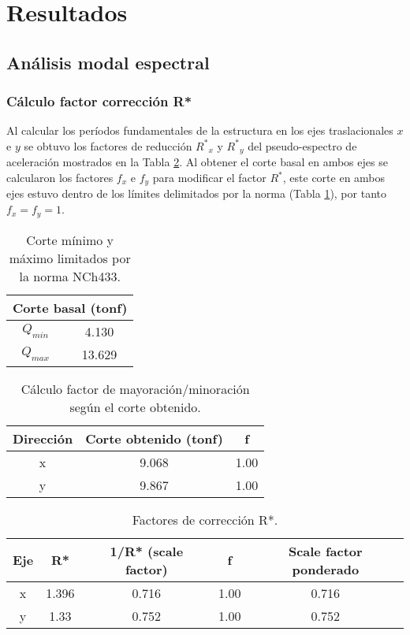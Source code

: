 \newpage
\section{Resultados}

\subsection{Análisis modal espectral}

\subsubsection{Cálculo factor corrección R*}

Al calcular los períodos fundamentales de la estructura en los ejes traslacionales $x$ e $y$ se obtuvo los factores de reducción ${R^*}_x$ y ${R^*}_y$ del pseudo-espectro de aceleración mostrados en la Tabla \ref{tab:factores-reduccion-r}. Al obtener el corte basal en ambos ejes se calcularon los factores $f_x$ e $f_y$ para modificar el factor $R^*$, este corte en ambos ejes estuvo dentro de los límites delimitados por la norma (Tabla \ref{tab:cortemaximominimo}), por tanto $f_x=f_y=1$.

\begin{table}[H]
  \centering
  \caption{Corte mínimo y máximo limitados por la norma NCh433.}
  \begin{tabular}{cc}
    \hline
    \multicolumn{2}{c}{\textbf{Corte basal (tonf)}} \bigstrut\\
    \hline
    $Q_{min}$ & 4.130 \bigstrut[t]\\
    $Q_{max}$ & 13.629 \bigstrut[b]\\
    \hline
  \end{tabular}
  \label{tab:cortemaximominimo}
\end{table}

\begin{table}[H]
  \centering
  \caption{Cálculo factor de mayoración/minoración según el corte obtenido.}
  \begin{tabular}{ccc}
    \hline
    \textbf{Dirección} & \textbf{Corte obtenido (tonf)} & \textbf{f} \bigstrut\\
    \hline
    x     & 9.068 & 1.00 \bigstrut[t]\\
    y     & 9.867 & 1.00 \bigstrut[b]\\
    \hline
  \end{tabular}
\end{table}

\begin{table}[H]
  \centering
  \caption{Factores de corrección R*.}
  \begin{tabular}{ccccc}
    \hline
    \textbf{Eje} & \textbf{R*} & \textbf{1/R* (scale factor)} & \textbf{f} & \textbf{Scale factor ponderado} \bigstrut\\
    \hline
    x     & 1.396 & 0.716 & 1.00  & 0.716 \bigstrut[t]\\
    y     & 1.33  & 0.752 & 1.00  & 0.752 \bigstrut[b]\\
    \hline
  \end{tabular}
  \label{tab:factores-reduccion-r}
\end{table}

